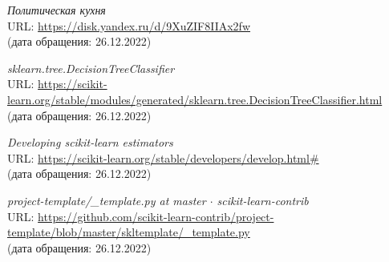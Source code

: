 \begin{thebibliography}{99}

    {\itshape Политическая кухня}\\
    URL: \url{https://disk.yandex.ru/d/9XuZIF8IIAx2fw}\\
    (дата обращения: 26.12.2022)

    {\itshape sklearn.tree.DecisionTreeClassifier}\\
    URL: \url{https://scikit-learn.org/stable/modules/generated/sklearn.tree.DecisionTreeClassifier.html}\\
    (дата обращения: 26.12.2022)

    {\itshape Developing scikit-learn estimators}\\
    URL: \url{https://scikit-learn.org/stable/developers/develop.html#}\\
    (дата обращения: 26.12.2022)

    {\itshape project-template/\_template.py at master $\cdot$ scikit-learn-contrib}\\
    URL: \url{https://github.com/scikit-learn-contrib/project-template/blob/master/skltemplate/_template.py}\\
    (дата обращения: 26.12.2022)


\end{thebibliography}
